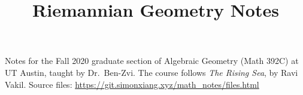 \documentclass[fontsize=9pt]{article}
\title{Riemannian Geometry Notes}
\begin{document}
\maketitle
Notes for the Fall 2020 graduate section of Algebraic Geometry (Math 392C) at UT Austin, taught by Dr.\ Ben-Zvi. The course follows \emph{The Rising Sea}, by Ravi Vakil. Source files: \url{https://git.simonxiang.xyz/math_notes/files.html}
\tableofcontents
\newpage
    
\end{document}
